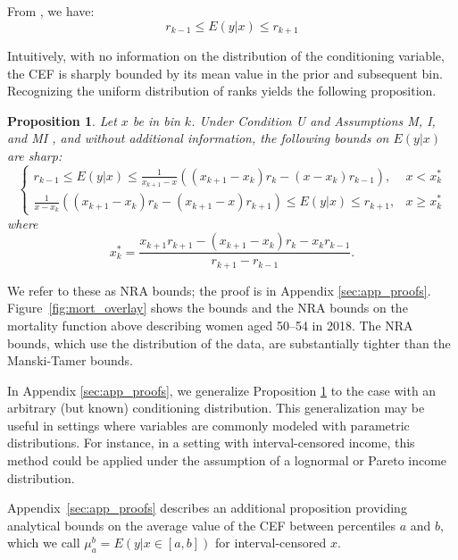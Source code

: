 \documentclass[12pt,letterpaper]{article}
\newtheorem{proposition}{Proposition}
\numberwithin{equation}{section}
\begin{document}
From \citet{Manski2002}, we have: 
\begin{equation}
  r_{k-1} \leq E(y | x) \leq r_{k+1}
  \tag{Manski-Tamer bounds} 
\end{equation}

Intuitively, with no information on the distribution of the conditioning variable, the CEF is sharply bounded by its mean value in the prior and subsequent bin.  Recognizing the uniform distribution of ranks yields the following proposition.

\begin{proposition}
  \label{eq:cef_bound}
\nonumber
  Let $x$ be in bin $k$. Under Condition U and Assumptions M, I, and MI \citep{Manski2002},
  and without additional information, the
  following bounds on $E(y \vert x)$ are sharp:
  $$
  \begin{cases}
    r_{k-1} \leq E(y \vert x) \leq \frac{1}{x_{k+1} - x} \left(
    \left(x_{k+1} - x_k\right) r_k - \left(x - x_k\right) r_{k-1} \right), & x < x_k^* \\
    \frac{1}{x - x_k} \left( \left(x_{k+1} - x_k\right) r_k -
    \left(x_{k+1} - x\right) r_{k+1} \right) \leq E(y \vert x) \leq r_{k+1}, & x \geq x_k^*
  \end{cases}
  $$
  where $$x_k^* = \frac{x_{k+1} r_{k+1}
    - \left(x_{k+1} - x_k\right) r_k -
    x_k r_{k-1}  }{r_{k+1} - r_{k-1} }.$$ 
\end{proposition} 

We refer to these as NRA bounds; the proof is in Appendix
\ref{sec:app_proofs}. Figure~\ref{fig:mort_overlay} shows
the \citet{Manski2002} bounds and the NRA bounds on the mortality
function above describing women aged 50--54 in 2018. The NRA bounds, which use the distribution of the data, are substantially tighter than the Manski-Tamer bounds.

In Appendix \ref{sec:app_proofs}, we generalize Proposition \ref{eq:cef_bound} to the case with an arbitrary (but known) conditioning distribution. This generalization may be useful in settings where variables are commonly modeled with parametric distributions. For instance, in a setting with interval-censored income, this method could be applied under the assumption of a lognormal or Pareto income distribution.

Appendix~\ref{sec:app_proofs} describes an additional proposition
providing analytical bounds on the average value of the CEF between
percentiles $a$ and $b$, which we call $\mu_a^b = E(y | x \in [a,b])$
for interval-censored $x$. 
\end{document}
